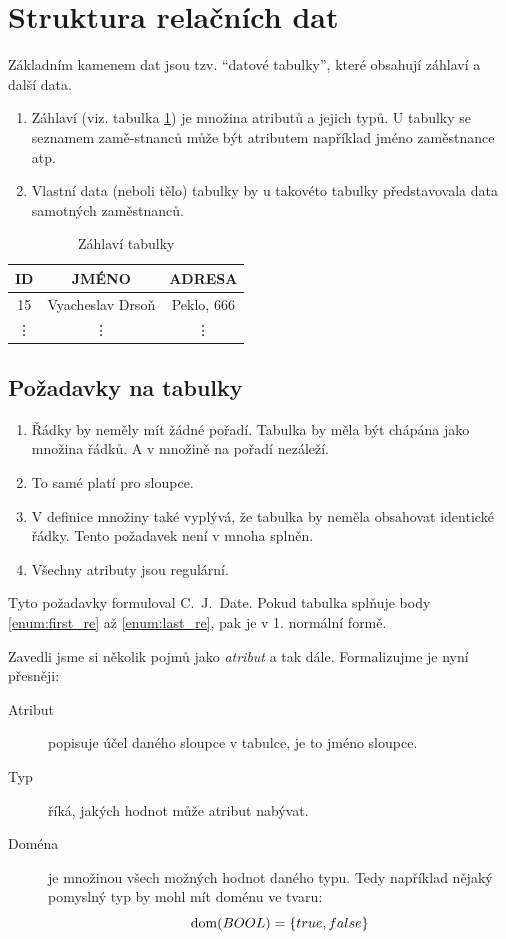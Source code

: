 \section{Struktura relačních dat}
Základním kamenem dat jsou tzv. \enquote{datové tabulky}, které obsahují záhlaví a další data.
\begin{enumerate}
\item Záhlaví (viz. tabulka \ref{tab:zahlavi}) je množina atributů a jejich typů. U tabulky se seznamem zamě-stnanců může být atributem například jméno zaměstnance atp.
\item Vlastní data (neboli tělo) tabulky by u takovéto tabulky představovala data samotných zaměstnanců.
\end{enumerate}

\begin{table}
\caption{Záhlaví tabulky}\label{tab:zahlavi}
\begin{center}
\begin{tabular}{|c|c|c|}
\hline
ID & JMÉNO & ADRESA \\
\hline
15 & Vyacheslav Drsoň & Peklo, 666 \\
\hline
\vdots & \vdots & \vdots \\
\hline
\end{tabular}
\end{center}
\end{table}

\subsection{Požadavky na tabulky}
\begin{enumerate}
\item\label{enum:first_re} Řádky by neměly mít žádné pořadí. Tabulka by měla být chápána jako množina řádků. A v množině na pořadí nezáleží.
\item To samé platí pro sloupce.
\item V definice množiny také vyplývá, že tabulka by neměla obsahovat identické řádky. Tento požadavek není v mnoha  splněn.
\item\label{enum:last_re} Všechny atributy jsou regulární.
\end{enumerate}
Tyto požadavky formuloval C.~J.~Date.
Pokud tabulka splňuje body \ref{enum:first_re} až \ref{enum:last_re}, pak je v 1. normální formě.

Zavedli jsme si několik pojmů jako \textit{atribut} a tak dále. Formalizujme je nyní přesněji:
\begin{description}
\item[Atribut] popisuje účel daného sloupce v tabulce, je to jméno sloupce.
\item[Typ] říká, jakých hodnot může atribut nabývat.
\item[Doména] je množinou všech možných hodnot daného typu. Tedy například nějaký pomyslný typ by mohl mít doménu ve tvaru: $$
\operatorname{dom}(BOOL) = \lbrace true, false \rbrace
$$
\end{description}

